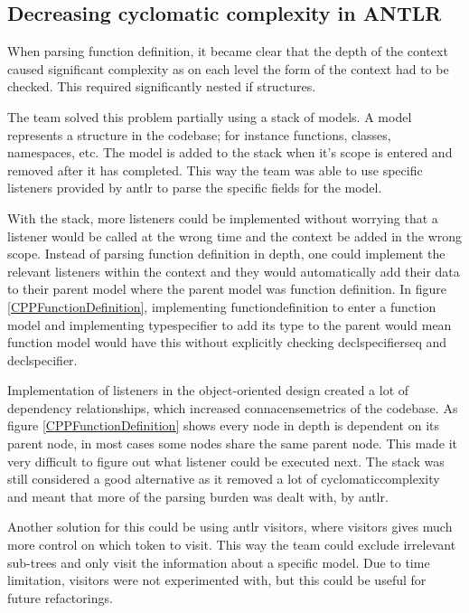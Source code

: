 \subsection{Decreasing cyclomatic complexity in ANTLR}

When parsing function definition, it became clear that the depth of the context caused significant complexity as on each level the form of the context had to be checked. This required significantly nested if structures.

The team solved this problem partially using a stack of models. A model represents a structure in the codebase; for instance functions, classes, namespaces, etc. The model is added to the stack when it's scope is entered and removed after it has completed. This way the team was able to use specific listeners provided by \gls{antlr} to parse the specific fields for the model. 

With the stack, more listeners could be implemented without worrying that a listener would be called at the wrong time and the context be added in the wrong scope. Instead of parsing function definition in depth, one could implement the relevant listeners within the context and they would automatically add their data to their parent model where the parent model was function definition.
In figure \ref{CPPFunctionDefinition}, implementing functiondefinition to enter a function model and implementing typespecifier to add its type to the parent would mean function model would have this without explicitly checking declspecifierseq and declspecifier. 

Implementation of listeners in the object-oriented design created a lot of dependency relationships, which increased \gls{connacensemetrics} of the codebase. As figure \ref{CPPFunctionDefinition} shows every node in depth is dependent on its parent node, in most cases some nodes share the same parent node. This made it very difficult to figure out what listener could be executed next. The stack was still considered a good alternative as it removed a lot of \gls{cyclomaticcomplexity} and meant that more of the parsing burden was dealt with, by \gls{antlr}. 

Another solution for this could be using \gls{antlr} visitors, where visitors gives much more control on which token to visit. This way the team could exclude irrelevant sub-trees and only visit the information about a specific model. Due to time limitation, visitors were not experimented with, but this could be useful for future refactorings.

